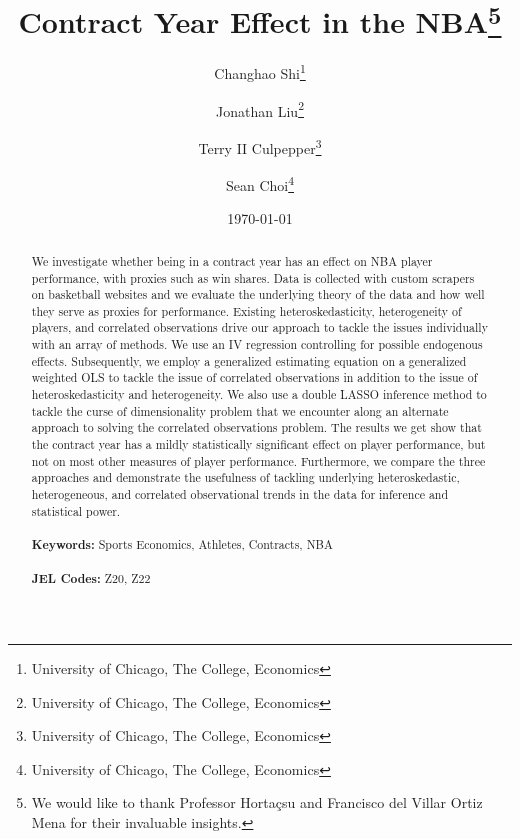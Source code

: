 \documentclass[12pt]{article}
\begin{document}
	
	\begin{titlepage}
		\title{Contract Year Effect in the NBA\thanks{We would like to thank Professor Hortaçsu and Francisco del Villar Ortiz Mena for their invaluable insights.}}
		\author{Changhao Shi\thanks{University of Chicago, The College, Economics} \and Jonathan Liu\thanks{University of Chicago, The College, Economics} \and Terry II Culpepper\thanks{University of Chicago, The College, Economics} \and Sean Choi\thanks{University of Chicago, The College, Economics}}
		\date{\today}
		\maketitle
		\begin{abstract}
			\noindent We investigate whether being in a contract year has an effect on NBA player performance, with proxies such as win shares. Data is collected with custom scrapers on basketball websites and we evaluate the underlying theory of the data and how well they serve as proxies for performance. Existing heteroskedasticity, heterogeneity of players, and correlated observations drive our approach to tackle the issues individually with an array of methods. We use an IV regression controlling for possible endogenous effects. Subsequently, we employ a generalized estimating equation on a generalized weighted OLS to tackle the issue of correlated observations in addition to the issue of heteroskedasticity and heterogeneity. We also use a double LASSO inference method to tackle the curse of dimensionality problem that we encounter along an alternate approach to solving the correlated observations problem. The results we get show that the contract year has a mildly statistically significant effect on player performance, but not on most other measures of player performance. Furthermore, we compare the three approaches and demonstrate the usefulness of tackling underlying heteroskedastic, heterogeneous, and correlated observational trends in the data for inference and statistical power. \\
			\vspace{0in}\\
			\noindent\textbf{Keywords:} Sports Economics, Athletes, Contracts, NBA\\
			\vspace{0in}\\
			\noindent\textbf{JEL Codes:} Z20, Z22 \\
			
			\bigskip
		\end{abstract}
		\setcounter{page}{0}
		\thispagestyle{empty}
	\end{titlepage}
	\pagebreak \newpage
	
\end{document}
